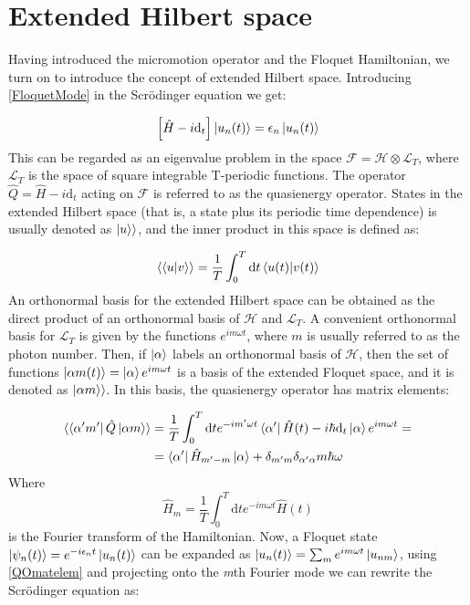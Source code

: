 \section{Extended Hilbert space}

Having introduced the micromotion operator and the Floquet Hamiltonian, we turn on to introduce the concept of extended Hilbert space. Introducing \ref{FloquetMode} in the Scr\"{o}dinger equation we get:

\begin{equation}
\left[ \hat{H}-i\text{d}_t\right] \ket{u_n(t)} = \epsilon_n\ket{u_n(t)}
\end{equation}
This can be regarded as an eigenvalue problem in the space $\mathcal{F}=\mathcal{H}\otimes\mathcal{L}_T$, where $\mathcal{L}_T$ is the space of square integrable T-periodic functions. The operator $\hat{Q} = \hat{H}-i\text{d}_t$ acting on $\mathcal{F}$ is referred to as the quasienergy operator. States in the extended Hilbert space (that is, a state plus its periodic time dependence) is usually denoted as $\ket{u}\rangle$, and the inner product in this space is defined as:

\begin{equation}
\langle \bra{u}\ket{v} \rangle = \frac{1}{T}\int_0^T \text{d}t \bra{u(t)}\ket{v(t)}
\end{equation}
An orthonormal basis for the extended Hilbert space can be obtained as the direct product of an orthonormal basis of $\mathcal{H}$ and $\mathcal{L}_T$. A convenient orthonormal basis for $\mathcal{L}_T$ is given by the functions $e^{im\omega t}$, where $m$ is usually referred to as the photon number. Then, if $\ket{\alpha}$ labels an orthonormal basis of $\mathcal{H}$, then the set of functions $\ket{\alpha m (t)} = \ket{\alpha}e^{im\omega t}$ is a basis of the extended Floquet space, and it is denoted as $\ket{\alpha m}\rangle$. In this basis, the quasienergy operator has matrix elements:

\begin{align}
\langle \bra{\alpha' m'}\hat{Q}\ket{\alpha m} \rangle &= \frac{1}{T}\int_0^T \text{d}t e^{-im'\omega t}\bra{\alpha'} \hat{H}(t)-i\hbar\text{d}_t \ket{\alpha}e^{im\omega t} = \nonumber \\
&= \bra{\alpha'} \hat{H}_{m'-m} \ket{\alpha} + \delta_{m'm}\delta_{\alpha' \alpha}m\hbar\omega \label{QOmatelem}
\end{align}
Where
\begin{equation}
\hat{H}_m = \frac{1}{T}\int_0^T \text{d}t e^{-im\omega t}\hat{H}(t) 
\end{equation}
is the Fourier transform of the Hamiltonian. Now, a Floquet state $\ket{\psi_n(t)} = e^{-i \epsilon_n t}\ket{u_n(t)}$ can be expanded as $\ket{u_n(t)} = \sum_m e^{im\omega t}\ket{u_{nm}}$, using \ref{QOmatelem} and projecting onto the \textit{m}th Fourier mode we can rewrite the Scr\"{o}dinger equation as:

